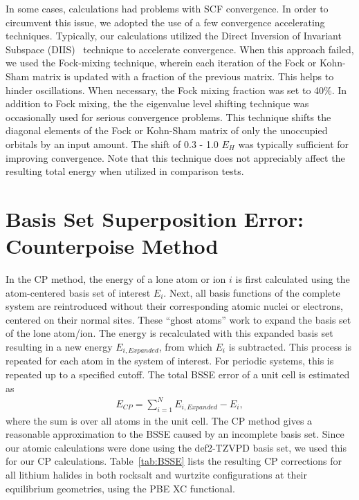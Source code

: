 \documentclass[titlepage,11pt]{article}
\begin{document}
In some cases, calculations had problems with SCF convergence. In order to circumvent this issue, we adopted the use of a few convergence accelerating techniques. Typically, our calculations utilized the Direct Inversion of Invariant Subspace (DIIS)~\cite{pulay1980convergence,pulay1982improved} technique to accelerate convergence. When this approach failed, we used the Fock-mixing technique, wherein each iteration of the Fock or Kohn-Sham matrix is updated with a fraction of the previous matrix. This helps to hinder oscillations. When necessary, the Fock mixing fraction was set to 40\%. In addition to Fock mixing, the the eigenvalue level shifting technique was occasionally used for serious convergence problems. This technique shifts the diagonal elements of the Fock or Kohn-Sham matrix of only the unoccupied orbitals by an input amount. The shift of 0.3 - 1.0 $E_{H}$ was typically sufficient for improving convergence. Note that this technique does not appreciably affect the resulting total energy when utilized in comparison tests.

\section{Basis Set Superposition Error: Counterpoise Method}

In the CP method, the energy of a lone atom or ion $i$ is first calculated using the atom-centered basis set of interest $E_{i}$. Next, all basis functions of the complete system are reintroduced without their corresponding atomic nuclei or electrons, centered on their normal sites. These ``ghost atoms'' work to expand the basis set of the lone atom/ion. The energy is recalculated with this expanded basis set resulting in a new energy $E_{i,Expanded}$, from which $E_{i}$ is subtracted. This process is repeated for each atom in the system of interest. For periodic systems, this is repeated up to a specified cutoff. The total BSSE error of a unit cell is estimated as
\begin{align}
E_{CP} = \sum_{i=1}^{N} E_{i,Expanded} - E_{i},
\end{align}
where the sum is over all atoms in the unit cell. The CP method gives a reasonable approximation to the BSSE caused by an incomplete basis set. Since our atomic calculations were done using the def2-TZVPD basis set, we used this for our CP calculations. Table~\ref{tab:BSSE} lists the resulting CP corrections for all lithium halides in both rocksalt and wurtzite configurations at their equilibrium geometries, using the PBE XC functional.
\end{document}
